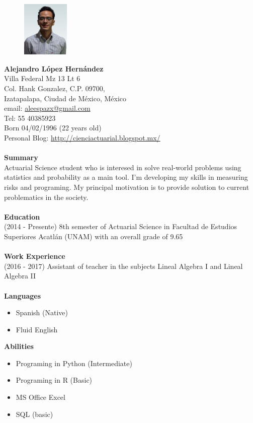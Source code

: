 \documentclass[11pt,letter]{article}
\begin{document}
\pagestyle{empty}
\noindent
\begin{figure}
    \centering
    \includegraphics[width=0.2\textwidth]{CV}
\end{figure} 
\Large{\textbf{Alejandro López Hernández}}  
\\
\normalsize
Villa Federal Mz 13 Lt 6\\ Col. Hank Gonzalez, C.P. 09700, \\Izatapalapa, Ciudad de México, México\\ email: \href{mailto:aleespazx@gmail.com}{aleespazx@gmail.com}\\Tel: 55 40385923 \\ Born 04/02/1996 (22 years old)\\ Personal Blog: \url{http://cienciactuarial.blogspot.mx/}\\\\
\noindent
\textbf{Summary}\\
Actuarial Science student who is interesed in solve real-world problems using statistics and probability as a main tool. I'm developing my skills in measuring risks and programing. My principal motivation is to provide solution to current problematics in the society. \\\\
\textbf{Education}\\
(2014 - Presente) 8th semester of Actuarial Science in Facultad de Estudios Superiores Acatlán (UNAM) with an overall grade of 9.65\\\\
\textbf{Work Experience}\\
(2016 - 2017) \quad Assistant of teacher in the subjects Lineal Algebra I and Lineal Algebra II\\\\
\textbf{Languages}
\begin{itemize}
\item Spanish (Native)
\item Fluid English
\end{itemize}
\textbf{Abilities}
\begin{itemize}
\item Programing in Python (Intermediate)
\item Programing in R (Basic)
\item MS Office Excel
\item SQL (basic)
\end{itemize}
\end{document}
